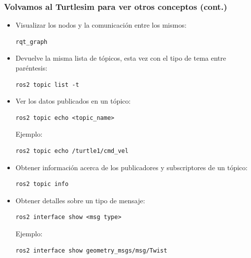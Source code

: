 \begin{frame}[fragile]
    \frametitle{Volvamos al Turtlesim para ver otros conceptos (cont.)}
	\footnotesize
	\begin{itemize}
        \item Visualizar los nodos y la comunicación entre los mismos:
\begin{lstlisting}[style=bash]  
rqt_graph
\end{lstlisting}

        \item Devuelve la misma lista de tópicos, esta vez con el tipo de tema entre paréntesis:
\begin{lstlisting}[style=bash]  
ros2 topic list -t
\end{lstlisting}
    
        \item Ver los datos publicados en un tópico:
\begin{lstlisting}[style=bash]  
ros2 topic echo <topic_name>
\end{lstlisting}
    
        Ejemplo:
\begin{lstlisting}[style=bash]  
ros2 topic echo /turtle1/cmd_vel
\end{lstlisting}
    
        \item Obtener información acerca de los publicadores y subscriptores de un tópico:
\begin{lstlisting}[style=bash]  
ros2 topic info
\end{lstlisting}
    
        \item Obtener detalles sobre un tipo de mensaje:
\begin{lstlisting}[style=bash]  
ros2 interface show <msg type>
\end{lstlisting}    

        Ejemplo:
\begin{lstlisting}[style=bash]  
ros2 interface show geometry_msgs/msg/Twist
\end{lstlisting}

    \end{itemize}

\end{frame}

